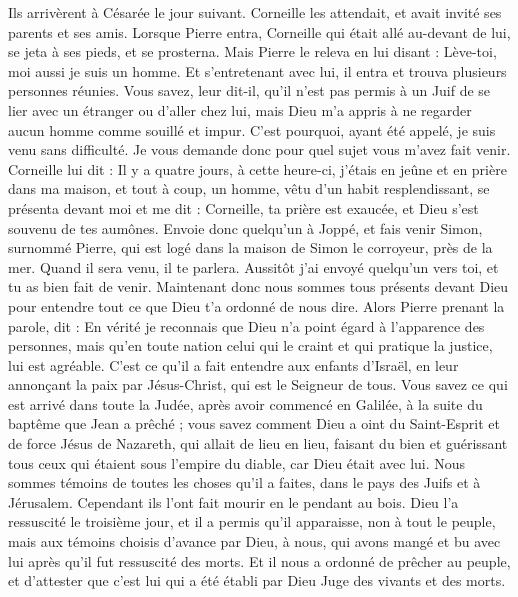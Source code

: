 \begin{multicols}{2}
Ils arrivèrent à Césarée le jour suivant. Corneille les attendait, et avait invité ses parents et ses amis.
Lorsque Pierre entra, Corneille qui était allé au-devant de lui, se jeta à ses pieds, et se prosterna.
Mais Pierre le releva en lui disant : Lève-toi, moi aussi je suis un homme.
Et s’entretenant avec lui, il entra et trouva plusieurs personnes réunies.
Vous savez, leur dit-il, qu’il n’est pas permis à un Juif de se lier avec un étranger ou d'aller chez lui, mais Dieu m'a appris à ne regarder aucun homme comme souillé et impur.
C'est pourquoi, ayant été appelé, je suis venu sans difficulté. Je vous demande donc pour quel sujet vous m'avez fait venir.
Corneille lui dit : Il y a quatre jours, à cette heure-ci, j'étais en jeûne et en prière dans ma maison, et tout à coup, un homme, vêtu d’un habit resplendissant, se présenta devant moi et me dit :
Corneille, ta prière est exaucée, et Dieu s'est souvenu de tes aumônes.
Envoie donc quelqu’un à Joppé, et fais venir Simon, surnommé Pierre, qui est logé dans la maison de Simon le corroyeur, près de la mer. Quand il sera venu, il te parlera.
Aussitôt j’ai envoyé quelqu’un vers toi, et tu as bien fait de venir. Maintenant donc nous sommes tous présents devant Dieu pour entendre tout ce que Dieu t'a ordonné de nous dire.
Alors Pierre prenant la parole, dit : En vérité je reconnais que Dieu n'a point égard à l'apparence des personnes,
mais qu'en toute nation celui qui le craint et qui pratique la justice, lui est agréable.
C'est ce qu'il a fait entendre aux enfants d'Israël, en leur annonçant la paix par Jésus-Christ, qui est le Seigneur de tous.
Vous savez ce qui est arrivé dans toute la Judée, après avoir commencé en Galilée, à la suite du baptême que Jean a prêché ;
vous savez comment Dieu a oint du Saint-Esprit et de force Jésus de Nazareth, qui allait de lieu en lieu, faisant du bien et guérissant tous ceux qui étaient sous l’empire du diable, car Dieu était avec lui.
Nous sommes témoins de toutes les choses qu'il a faites, dans le pays des Juifs et à Jérusalem. Cependant ils l'ont fait mourir en le pendant au bois.
Dieu l'a ressuscité le troisième jour, et il a permis qu’il apparaisse,
non à tout le peuple, mais aux témoins choisis d’avance par Dieu, à nous, qui avons mangé et bu avec lui après qu'il fut ressuscité des morts.
Et il nous a ordonné de prêcher au peuple, et d’attester que c'est lui qui a été établi par Dieu Juge des vivants et des morts.

\end{multicols}
